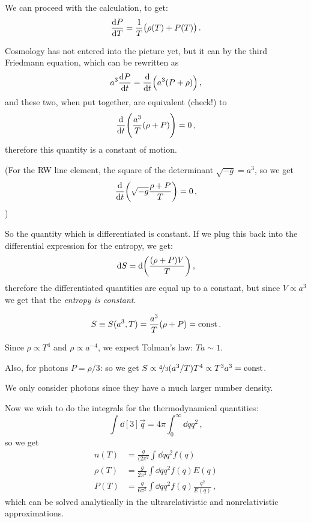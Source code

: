 \documentclass[main.tex]{subfiles}
\begin{document}
We can proceed with the calculation, to get: 
%
\begin{equation}
  \dv{P}{T} = \frac{1}{T} \qty(\rho (T ) + P(T))
\,.
\end{equation}
%

Cosmology has not entered into the picture yet, but it can by the third Friedmann equation, which can be rewritten as 
%
\begin{equation}
  a^3 \dv{P}{t} =\dv{}{t} \qty(a^3 (P + \rho ))
\,,
\end{equation}
%
and these two, when put together, are equivalent (check!) to 
%
\begin{equation}
  \dv{}{t} \qty(\frac{a^3}{T} (\rho + P ))=0
\,,
\end{equation}
%
therefore this quantity is a constant of motion. 


(For the RW line element, the square of the determinant \(\sqrt{-g} =  a^3 \), so we get 
%
\begin{equation}
  \dv{}{t} \qty(\sqrt{-g }  \frac{\rho + P}{T}) = 0
\,,
\end{equation}
)

So the quantity which is differentiated is constant. If we plug this back into the differential expression for the entropy, we get: 
%
\begin{equation}
  \dd{S} = \dd \qty(\frac{(\rho + P) V}{T})
\,,
\end{equation}
%
therefore the differentiated quantities are equal up to a constant, but since \(V \propto a^3\) we get that the \emph{entropy is constant}.

\begin{equation}
  S \equiv S(a^3, T) 
  = \frac{a^3}{T} \qty(\rho + P)
  = \const
\,.
\end{equation}

Since \(\rho \propto T^{4}\) and \(\rho \propto a^{-4}\), we expect Tolman's law: \(Ta \sim 1\).

Also, for photons \(P  = \rho / 3\): so we get \(S \propto \frac[i]{4}{3} (a^3/T) T^{4} \propto T^3 a^3 = \const\).

We only consider photons since they have a much larger number density.


Now we wish to do the integrals for the thermodynamical quantities: 
%
\begin{equation}
  \int  \dd[3]{\vec{q}} = 4 \pi \int_0^{\infty}  \dd{q} q^2 
\,,
\end{equation}
%
so we get 
%
\begin{subequations}
\begin{align}
  n(T) &= \frac{g}{(2\pi^2} \int  \dd{q} q^2 f(q) \\ 
  \rho (T) &= \frac{g}{2\pi^2} \int  \dd{q} q^2 f(q) E(q) \\ 
  P (T) &= \frac{g}{6\pi^2} \int  \dd{q} q^2 f(q) \frac{q^2}{E(q)} 
\,,
\end{align}
\end{subequations}
%
which can be solved analytically in the ultrarelativistic and nonrelativistic approximations.
\end{document}
